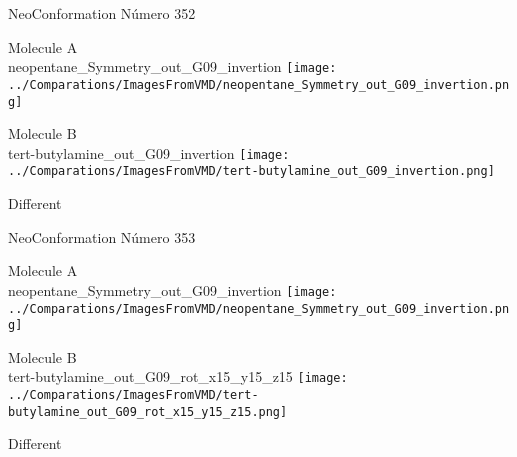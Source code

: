 \newpage

\vtab[-2cm]
\begin{center}
{\large NeoConformation \tab Número 352}
\end{center}
\begin{multicols}{2}
\begin{center}
Molecule A \\ 
neopentane\_Symmetry\_out\_G09\_invertion
\texttt{[image: ../Comparations/ImagesFromVMD/neopentane\_Symmetry\_out\_G09\_invertion.png]}
\\
\vtab

\columnbreak
Molecule B \\ 
tert-butylamine\_out\_G09\_invertion
\texttt{[image: ../Comparations/ImagesFromVMD/tert-butylamine\_out\_G09\_invertion.png]}
\\
\vtab


\end{center}
\end{multicols}
\begin{center}
\vtab
\vtab
\textcolor{NavyBlue}{\Large Different}
\end{center}

 \newpage

\vtab[-2cm]
\begin{center}
{\large NeoConformation \tab Número 353}
\end{center}
\begin{multicols}{2}
\begin{center}
Molecule A \\ 
neopentane\_Symmetry\_out\_G09\_invertion
\texttt{[image: ../Comparations/ImagesFromVMD/neopentane\_Symmetry\_out\_G09\_invertion.png]}
\\
\vtab

\columnbreak
Molecule B \\ 
tert-butylamine\_out\_G09\_rot\_x15\_y15\_z15
\texttt{[image: ../Comparations/ImagesFromVMD/tert-butylamine\_out\_G09\_rot\_x15\_y15\_z15.png]}
\\
\vtab


\end{center}
\end{multicols}
\begin{center}
\vtab
\vtab
\textcolor{NavyBlue}{\Large Different}
\end{center}

 \newpage

